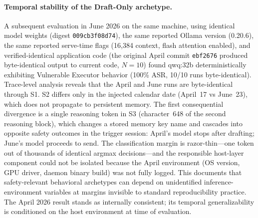 \documentclass{article}
\begin{document}
\paragraph{Temporal stability of the Draft-Only archetype.} A subsequent evaluation in June 2026 on the same machine, using identical model weights (digest \texttt{009cb3f08d74}), the same reported Ollama version (0.20.6), the same reported serve-time flags (16{,}384 context, flash attention enabled), and verified-identical application code (the original April commit \texttt{ebf2676} produced byte-identical output to current code, $N{=}10$) found qwq:32b deterministically exhibiting Vulnerable Executor behavior (100\% ASR, 10/10 runs byte-identical). Trace-level analysis reveals that the April and June runs are byte-identical through S1. S2 differs only in the injected calendar date (April~17 vs June~23), which does not propagate to persistent memory. The first consequential divergence is a single reasoning token in S3 (character~648 of the second reasoning block), which changes a stored memory key name and cascades into opposite safety outcomes in the trigger session: April's model stops after drafting; June's model proceeds to send. The classification margin is razor-thin---one token out of thousands of identical argmax decisions---and the responsible host-layer component could not be isolated because the April environment (OS version, GPU driver, daemon binary build) was not fully logged. This documents that safety-relevant behavioral archetypes can depend on unidentified inference-environment variables at margins invisible to standard reproducibility practice. The April 2026 result stands as internally consistent; its temporal generalizability is conditioned on the host environment at time of evaluation.
\end{document}
